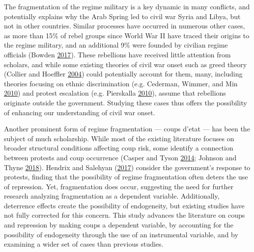 \documentclass[12pt,]{article}
\theoremstyle{definition}
\theoremstyle{definition}
\theoremstyle{definition}
\theoremstyle{remark}
\begin{document}
The fragmentation of the regime military is a key dynamic in many
conflicts, and potentially explains why the Arab Spring led to civil war
Syria and Libya, but not in other countries. Similar processes have
occurred in numerous other cases, as more than 15\% of rebel groups
since World War II have traced their origins to the regime military, and
an additional 9\% were founded by civilian regime officials (Bowden
\protect\hyperlink{ref-Bowden2017}{2017}). These rebellions have
received little attention from scholars, and while some existing
theories of civil war onset such as greed theory (Collier and Hoeffler
\protect\hyperlink{ref-Collier2004}{2004}) could potentially account for
them, many, including theories focusing on ethnic discrimination (e.g.
Cederman, Wimmer, and Min \protect\hyperlink{ref-Cederman2010}{2010})
and protest escalation (e.g. Pierskalla
\protect\hyperlink{ref-Pierskalla2010}{2010}), assume that rebellions
originate outside the government. Studying these cases thus offers the
possibility of enhancing our understanding of civil war onset.

Another prominent form of regime fragmentation --- coups d'etat --- has
been the subject of much scholarship. While most of the existing
literature focuses on broader structural conditions affecting coup risk,
some identify a connection between protests and coup occurrence (Casper
and Tyson \protect\hyperlink{ref-Casper2014}{2014}; Johnson and Thyne
\protect\hyperlink{ref-Johnson2018}{2018}). Hendrix and Salehyan
(\protect\hyperlink{ref-Hendrix2017}{2017}) consider the government's
response to protests, finding that the possibility of regime
fragmentation often deters the use of repression. Yet, fragmentation
does occur, suggesting the need for further research analyzing
fragmentation as a dependent variable. Additionally, deterrence effects
create the possibility of endogeneity, but existing studies have not
fully corrected for this concern. This study advances the literature on
coups and repression by making coups a dependent variable, by accounting
for the possibility of endogeneity through the use of an instrumental
variable, and by examining a wider set of cases than previous studies.
\end{document}
